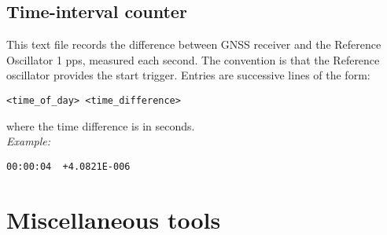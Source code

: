 \subsection{Time-interval counter \label{s:TICformat}}

This text file records the difference between GNSS receiver and the Reference Oscillator 1 pps,
measured each second. The convention is that the Reference oscillator provides the start trigger.
Entries are successive lines of the form:
\begin{lstlisting}
<time_of_day> <time_difference>
\end{lstlisting}
where the time difference is in seconds.\\
\textit{Example:}
\begin{lstlisting}
00:00:04  +4.0821E-006 
\end{lstlisting}
































\section{Miscellaneous tools}














